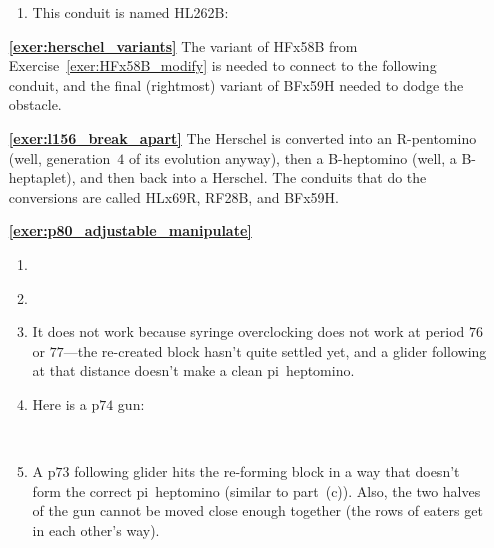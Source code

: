 \begin{multicols}{2}
\begin{itemize}[leftmargin=0em]
\begin{enumerate}[leftmargin=1.5em,label=\bf\color{ocre}(\alph*)]
			\item This conduit is named HL262B:
			\begin{center}
			\end{center}
		\end{enumerate}
		
		
		\item[\bf\color{ocre}\sffamily\ref{exer:herschel_variants}] The variant of HFx58B from Exercise~\ref{exer:HFx58B_modify} is needed to connect to the following conduit, and the final (rightmost) variant of BFx59H needed to dodge the obstacle.
		\begin{center}
		\end{center}
		
		
		\item[\bf\color{ocre}\sffamily\ref{exer:l156_break_apart}] The Herschel is converted into an R-pentomino (well, generation~$4$ of its evolution anyway), then a B-heptomino (well, a B-heptaplet), and then back into a Herschel. The conduits that do the conversions are called HLx69R, RF28B, and BFx59H.\\
		

		\item[\bf\color{ocre}\sffamily\ref{exer:p80_adjustable_manipulate}] \begin{enumerate}[leftmargin=1.5em,label=\bf\color{ocre}(\alph*)]
			\item {} \\
			
			\item {} \\
			
			\item It does not work because syringe overclocking does not work at period $76$ or $77$---the re-created block hasn't quite settled yet, and a glider following at that distance doesn't make a clean pi~heptomino.
			
			\item Here is a p$74$ gun:
			\begin{center}
				\\
			\end{center}
			
			\item A p$73$ following glider hits the re-forming block in a way that doesn't form the correct pi~heptomino (similar to part~(c)). Also, the two halves of the gun cannot be moved close enough together (the rows of eaters get in each other's way).\\
		\end{enumerate}
		

\end{itemize}
\end{multicols}
